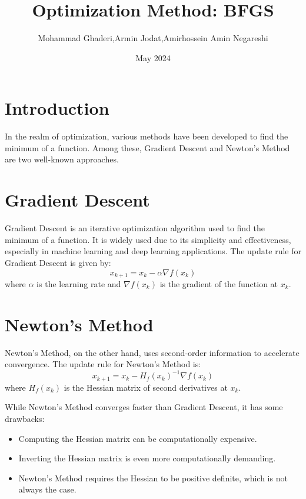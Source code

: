 \documentclass{article}
\title{Optimization Method: BFGS}
\author{Mohammad Ghaderi,Armin Jodat,Amirhossein Amin Negareshi}
\date{May 2024}
\begin{document}
\maketitle

\section{Introduction}

In the realm of optimization, various methods have been developed to find the minimum of a function. Among these, Gradient Descent and Newton's Method are two well-known approaches.

\section{Gradient Descent}

Gradient Descent is an iterative optimization algorithm used to find the minimum of a function. It is widely used due to its simplicity and effectiveness, especially in machine learning and deep learning applications. The update rule for Gradient Descent is given by:
\begin{equation}
x_{k+1} = x_k - \alpha \nabla f(x_k)
\end{equation}
where \( \alpha \) is the learning rate and \( \nabla f(x_k) \) is the gradient of the function at \( x_k \).

\section{Newton's Method}

Newton's Method, on the other hand, uses second-order information to accelerate convergence. The update rule for Newton's Method is:
\begin{equation}
x_{k+1} = x_k - H_f(x_k)^{-1} \nabla f(x_k)
\end{equation}
where \( H_f(x_k) \) is the Hessian matrix of second derivatives at \( x_k \).

While Newton's Method converges faster than Gradient Descent, it has some drawbacks:
\begin{itemize}
    \item Computing the Hessian matrix can be computationally expensive.
    \item Inverting the Hessian matrix is even more computationally demanding.
    \item Newton's Method requires the Hessian to be positive definite, which is not always the case.
\end{itemize}
\end{document}
